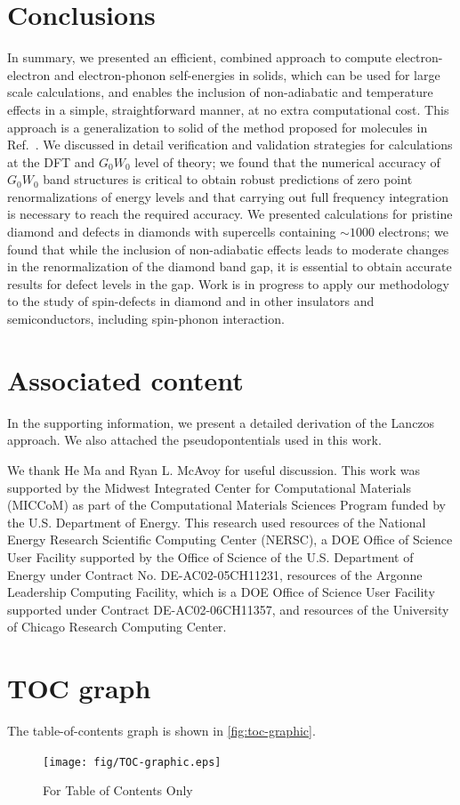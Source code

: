 \documentclass[journal=jctcce,manuscript=article]{achemso}
\begin{document}
\section{Conclusions}
In summary, we presented an efficient, combined approach to compute  electron-electron and electron-phonon self-energies in solids, which can be used for large scale calculations, and enables the inclusion of non-adiabatic and temperature effects in a simple, straightforward manner, at no extra computational cost. 
This approach is a generalization to solid of the method proposed for molecules in Ref.~.  We discussed in detail verification and validation strategies for calculations at the DFT and $G_0W_0$ level of theory; we found  that the numerical accuracy of $G_0W_0$ band structures is critical to obtain robust predictions of zero point renormalizations of energy levels and that carrying out full frequency integration is necessary to reach the required accuracy. We presented calculations for pristine diamond and defects in diamonds with supercells containing $\sim 1000$ electrons; we found that while the inclusion of non-adiabatic effects leads to moderate changes in the renormalization of the diamond band gap, it is essential to obtain accurate results for defect levels in the gap. Work is in progress to apply our methodology to the study of spin-defects in diamond and in other insulators and semiconductors, including spin-phonon interaction.

\section{Associated content}
In the supporting information, we present a detailed derivation of the Lanczos approach. We also attached the pseudopontentials used in this work.

\begin{acknowledgement}
We thank He Ma and Ryan L. McAvoy for useful discussion. This work was supported by the Midwest Integrated Center for Computational Materials (MICCoM) as part of the Computational Materials Sciences Program funded by the U.S. Department of Energy. This research used resources of the National Energy Research Scientific Computing Center (NERSC), a DOE Office of Science User Facility supported by the Office of Science of the U.S. Department of Energy under Contract No. DE-AC02-05CH11231, resources of the Argonne Leadership Computing Facility, which is a DOE Office of Science User Facility supported under Contract DE-AC02-06CH11357, and resources of the University of Chicago Research Computing Center.
\end{acknowledgement}


\clearpage

\section{TOC graph}
The table-of-contents graph is shown in \autoref{fig:toc-graphic}.
\begin{figure}
    \centering
    \texttt{[image: fig/TOC-graphic.eps]}
    \caption{For Table of Contents Only}
    \label{fig:toc-graphic}
\end{figure}
\end{document}
